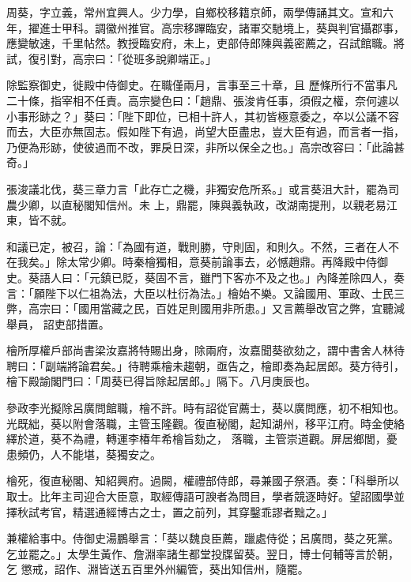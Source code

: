 \begin{pinyinscope}
 周葵，字立義，常州宜興人。少力學，自鄉校移籍京師，兩學傳誦其文。宣和六年，擢進士甲科。調徽州推官。高宗移蹕臨安，諸軍交馳境上，葵與判官攝郡事，應變敏速，千里帖然。教授臨安府，未上，吏部侍郎陳與義密薦之，召試館職。將試，復引對，高宗曰：「從班多說卿端正。」



 除監察御史，徙殿中侍御史。在職僅兩月，言事至三十章，且
 歷條所行不當事凡二十條，指宰相不任責。高宗變色曰：「趙鼎、張浚肯任事，須假之權，奈何遽以小事形跡之？」葵曰：「陛下即位，已相十許人，其初皆極意委之，卒以公議不容而去，大臣亦無固志。假如陛下有過，尚望大臣盡忠，豈大臣有過，而言者一指，乃便為形跡，使彼過而不改，罪戾日深，非所以保全之也。」高宗改容曰：「此論甚奇。」



 張浚議北伐，葵三章力言「此存亡之機，非獨安危所系。」或言葵沮大計，罷為司農少卿，以直秘閣知信州。未
 上，鼎罷，陳與義執政，改湖南提刑，以親老易江東，皆不就。



 和議已定，被召，論：「為國有道，戰則勝，守則固，和則久。不然，三者在人不在我矣。」除太常少卿。時秦檜獨相，意葵前論事去，必憾趙鼎。再降殿中侍御史。葵語人曰：「元鎮已貶，葵固不言，雖門下客亦不及之也。」內降差除四人，奏言：「願陛下以仁祖為法，大臣以杜衍為法。」檜始不樂。又論國用、軍政、士民三弊，高宗曰：「國用當藏之民，百姓足則國用非所患。」又言薦舉改官之弊，宜聽減舉員，
 詔吏部措置。



 檜所厚權戶部尚書梁汝嘉將特賜出身，除兩府，汝嘉聞葵欲劾之，謂中書舍人林待聘曰：「副端將論君矣。」待聘乘檜未趨朝，亟告之，檜即奏為起居郎。葵方待引，檜下殿諭閣門曰：「周葵已得旨除起居郎。」隔下。八月庚辰也。



 參政李光擬除呂廣問館職，檜不許。時有詔從官薦士，葵以廣問應，初不相知也。光既絀，葵以附會落職，主管玉隆觀。復直秘閣，起知湖州，移平江府。時金使絡繹於道，葵不為禮，轉運李椿年希檜旨劾之，
 落職，主管崇道觀。屏居鄉閭，憂患頻仍，人不能堪，葵獨安之。



 檜死，復直秘閣、知紹興府。過闕，權禮部侍郎，尋兼國子祭酒。奏：「科舉所以取士。比年主司迎合大臣意，取經傳語可諛者為問目，學者競逐時好。望詔國學並擇秋試考官，精選通經博古之士，置之前列，其穿鑿乖謬者黜之。」



 兼權給事中。侍御史湯鵬舉言：「葵以魏良臣薦，躐處侍從；呂廣問，葵之死黨。乞並罷之。」太學生黃作、詹淵率諸生都堂投牒留葵。翌日，博士何輔等言於朝，乞
 懲戒，詔作、淵皆送五百里外州編管，葵出知信州，隨罷。




\end{pinyinscope}
